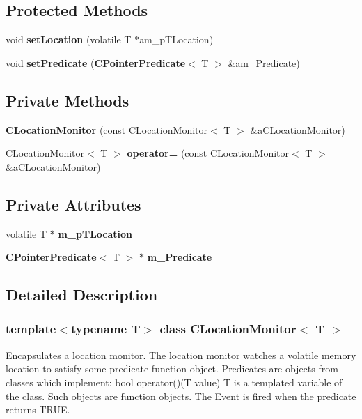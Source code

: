\subsection*{Protected Methods}
\begin{CompactItemize}
\item 
void {\bf set\-Location} (volatile T $\ast$am\_\-p\-TLocation)
\item 
void {\bf set\-Predicate} ({\bf CPointer\-Predicate}$<$ T $>$ \&am\_\-Predicate)
\end{CompactItemize}
\subsection*{Private Methods}
\begin{CompactItemize}
\item 
{\bf CLocation\-Monitor} (const CLocation\-Monitor$<$ T $>$ \&a\-CLocation\-Monitor)
\item 
CLocation\-Monitor$<$ T $>$ {\bf operator=} (const CLocation\-Monitor$<$ T $>$ \&a\-CLocation\-Monitor)
\end{CompactItemize}
\subsection*{Private Attributes}
\begin{CompactItemize}
\item 
volatile T $\ast$ {\bf m\_\-p\-TLocation}
\item 
{\bf CPointer\-Predicate}$<$ T $>$ $\ast$ {\bf m\_\-Predicate}
\end{CompactItemize}


\subsection{Detailed Description}
\subsubsection*{template$<$typename T$>$ class CLocation\-Monitor$<$ T $>$}

Encapsulates a location monitor.  The location monitor watches a volatile memory location  to satisfy some predicate function object. Predicates are objects from classes which implement: bool operator()(T value) T is a templated variable of the class. Such objects are function objects. The  Event is fired when the predicate returns TRUE. 



